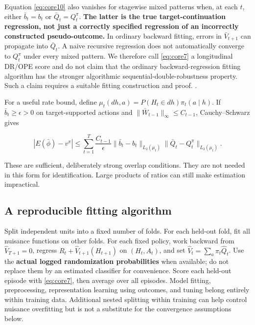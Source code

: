 Equation \eqref{eq:core10} also vanishes for stagewise mixed patterns when, at each \(t\), either \(\bar b_t=b_t\) or \(\bar Q_t=Q_t^{\pi}\). \textbf{The latter is the true target-continuation regression, not just a correctly specified regression of an incorrectly constructed pseudo-outcome.} In ordinary backward fitting, errors in \(\bar V_{t+1}\) can propagate into \(\bar Q_t\). A naive recursive regression does not automatically converge to \(Q_t^{\pi}\) under every mixed pattern. We therefore call \eqref{eq:core7} a longitudinal DR/OPE score and do not claim that the ordinary backward-regression fitting algorithm has the stronger algorithmic sequential-double-robustness property. Such a claim requires a suitable fitting construction and proof. \citep{luedtke2017sdr}.

For a useful rate bound, define \(\mu_t(dh,a)=P(H_t\in dh)\pi_t(a\mid h)\). If \(\bar b_t\ge\epsilon>0\) on target-supported actions and \(\|\bar W_{t-1}\|_\infty\le C_{t-1}\), Cauchy--Schwarz gives

\begin{equation}\label{eq:core11}
|E(\bar\phi)-v^{\pi}|
\le\sum_{t=1}^{T}\frac{C_{t-1}}{\epsilon}
\|\bar b_t-b_t\|_{L_2(\mu_t)}
\|\bar Q_t-Q_t^{\pi}\|_{L_2(\mu_t)}.
\end{equation}

These are sufficient, deliberately strong overlap conditions. They are not needed in this form for identification. Large products of ratios can still make estimation impractical.

\subsection{A reproducible fitting algorithm}\label{a-reproducible-fitting-algorithm}

Split independent units into a fixed number of folds. For each held-out fold, fit all nuisance functions on other folds. For each fixed policy, work backward from \(\widehat V_{T+1}=0\), regress \(R_t+\widehat V_{t+1}(H_{t+1})\) on \((H_t,A_t)\), and set \(\widehat V_t=\sum_a\pi_t\widehat Q_t\). Use the \textbf{actual logged randomization probabilities} when available; do not replace them by an estimated classifier for convenience. Score each held-out episode with \eqref{eq:core7}, then average over all episodes. Model fitting, preprocessing, representation learning using outcomes, and tuning belong entirely within training data. Additional nested splitting within training can help control nuisance overfitting but is not a substitute for the convergence assumptions below.

